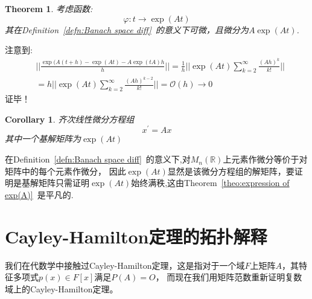 \documentclass[a4paper,12pt]{ctexart}
\newenvironment{prooff}{{\noindent\it\textcolor{cyan!40!black}{Proof}:}\quad}{\par}
\newtheorem{coro}[defn]{Corollary}
\newtheorem{theo}[defn]{Theorem}
\newcommand{\bb}[1]{\mathbb{#1}}
\begin{document}
\begin{theo}
    考虑函数:
    \begin{equation*}
        \varphi:t\rightarrow \exp(At)
    \end{equation*}
    其在Definition~\ref{defn:Banach space diff}~的意义下可微，且微分为$A\exp(At)$.
\end{theo}
\begin{prooff}
    注意到:
    \begin{align*}
         & ||\frac{\exp(A(t+h)-\exp(At)-A\exp(tA)h}{h} ||= \frac{1}{h} ||\exp(At)\sum_{k=2}^{\infty}\frac{(Ah)^{k}}{k!}|| \\
         & = h||\exp(At)\sum_{k=2}^{\infty}\frac{(Ah)^{k-2}}{k!}||=\mathcal{O}(h)\to 0
    \end{align*}
    证毕！
\end{prooff}
\begin{coro}
    齐次线性微分方程组
    \begin{equation*}
        x^{\prime}=Ax
    \end{equation*}
    其中一个基解矩阵为$\exp(At)$
\end{coro}
\begin{prooff}
    在Definition~\ref{defn:Banach space diff}~的意义下,对$M_n(\bb{R})$上元素作微分等价于对矩阵中的每个元素作微分，
    因此$\exp(At)$显然是该微分方程组的解矩阵，要证明是基解矩阵只需证明$\exp(At)$始终满秩,这由Theorem~\ref{theo:expression of exp(A)}~是平凡的.
\end{prooff}


\section{Cayley-Hamilton定理的拓扑解释}
我们在代数学中接触过Cayley-Hamilton定理，这是指对于一个域$F$上矩阵$A$，其特征多项式$p(x)\in F[x]$满足$P(A)=O$，
而现在我们用矩阵范数重新证明复数域上的Cayley-Hamilton定理。
\end{document}
